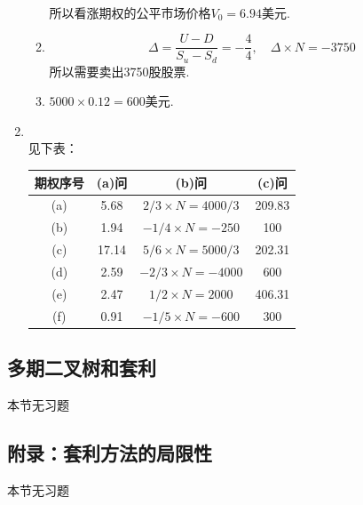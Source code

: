 \begin{enumerate}
\begin{enumerate}[label=(\alph*)]
\begin{align*}
        \end{align*}
        所以看涨期权的公平市场价格$V_0 = 6.94$美元.
        \item \[\Delta = \frac{U-D}{S_u-S_d}=-\frac{4}{4},\quad \Delta \times N=-3750\]
        所以需要卖出3750股股票.
        \item $5000 \times 0.12 = 600$美元.
    \end{enumerate}
    \item \sol\\
    见下表：
    \begin{table}[H]
        \centering
        \begin{tabular}{|c|c|c|c|}
            \hline
            期权序号 & (a)问 & (b)问 & (c)问 \\ \hline
            (a) & 5.68 & $2/3 \times N = 4000/3$ & 209.83 \\ \hline
            (b) & 1.94 & $-1/4 \times N = -250$ & 100 \\ \hline
            (c) & 17.14 & $5/6 \times N = 5000/3$ & 202.31 \\ \hline
            (d) & 2.59 & $-2/3 \times N = -4000$ & 600 \\ \hline
            (e) & 2.47 & $1/2 \times N = 2000$ & 406.31 \\ \hline
            (f) & 0.91 & $-1/5 \times N = -600$ & 300 \\ \hline
        \end{tabular}
    \end{table}
\end{enumerate}
\subsection{多期二叉树和套利}
本节无习题
\subsection{附录：套利方法的局限性}
本节无习题

